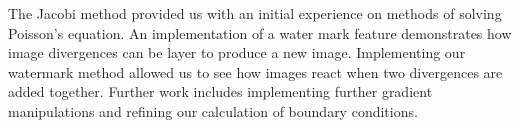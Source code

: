 \documentclass[10pt,twopage]{acmsiggraph}
\begin{document}
The Jacobi method provided us with an initial experience on methods of solving Poisson's equation. An implementation of a water mark feature demonstrates how image divergences can be layer to produce a new image. Implementing our watermark method allowed us to see how images react when two divergences are added together. Further work includes implementing further gradient manipulations and refining our calculation of boundary conditions.






{\small}

%
%


\cleardoublepage
\end{document}
